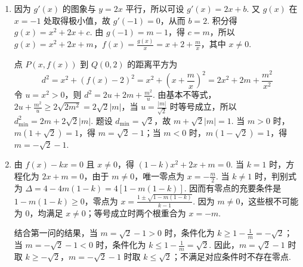 \begin{solution}
\begin{enumerate}
\item 因为 \(g'(x)\) 的图象与 \(y=2x\) 平行，所以可设 \(g'(x)=2x+b\). 又 \(g(x)\) 在 \(x=-1\) 处取得极小值，故 \(g'(-1)=0\)，从而 \(b=2\). 积分得 \(g(x)=x^2+2x+c\). 由 \(g(-1)=m-1\)，得 \(c=m\)，所以
\(g(x)=x^2+2x+m\)，\(f(x)=\frac{g(x)}x=x+2+\frac{m}{x}\)，其中 \(x\ne0\).

点 \(P(x,f(x))\) 到 \(Q(0,2)\) 的距离平方为
\[
d^2=x^2+\left(f(x)-2\right)^2=x^2+\left(x+\frac{m}{x}\right)^2
=2x^2+2m+\frac{m^2}{x^2}
\]
令 \(u=x^2>0\)，则
\(d^2=2u+2m+\frac{m^2}{u}\). 由基本不等式，
\(2u+\frac{m^2}{u}\geq2\sqrt{2m^2}=2\sqrt2|m|\)，当 \(u=\frac{|m|}{\sqrt2}\) 时等号成立，所以
\(d_{\min}^2=2m+2\sqrt2|m|\). 题设 \(d_{\min}=\sqrt2\)，故
\(m+\sqrt2|m|=1\).
当 \(m>0\) 时，\(m(1+\sqrt2)=1\)，得 \(m=\sqrt2-1\)；当 \(m<0\) 时，\(m(1-\sqrt2)=1\)，得 \(m=-\sqrt2-1\).
\item 由 \(f(x)-kx=0\) 且 \(x\ne0\)，得 \((1-k)x^2+2x+m=0\).
当 \(k=1\) 时，方程化为 \(2x+m=0\)，由于 \(m\ne0\)，唯一零点为 \(x=-\frac m2\). 当 \(k\ne1\) 时，判别式为
\(\Delta=4-4m(1-k)=4[1-m(1-k)]\). 因而有零点的充要条件是
\(1-m(1-k)\geqslant0\)，零点为
\(\displaystyle x=\frac{1\pm\sqrt{1-m(1-k)}}{k-1}\). 因为 \(m\ne0\)，这些根不可能为 \(0\)，均满足 \(x\ne0\)；等号成立时两个根重合为 \(x=-m\).

结合第一问的结果，当 \(m=\sqrt2-1>0\) 时，条件化为 \(k\geqslant1-\frac1m=-\sqrt2\)；当 \(m=-\sqrt2-1<0\) 时，条件化为 \(k\leqslant1-\frac1m=\sqrt2\). 因此，\(m=\sqrt2-1\) 时取 \(k\geqslant-\sqrt2\)，\(m=-\sqrt2-1\) 时取 \(k\leqslant\sqrt2\)；不满足对应条件时不存在零点.
\end{enumerate}
\end{solution}
